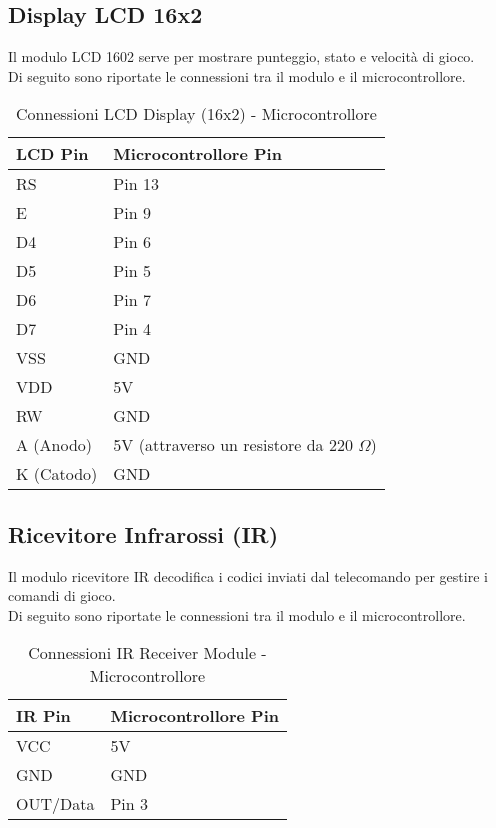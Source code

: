 \documentclass[a4paper, 12pt]{article}
\begin{document}
\subsection{Display LCD 16x2}
Il modulo LCD 1602 serve per mostrare punteggio, stato e velocità di gioco.\\
Di seguito sono riportate le connessioni tra il modulo e il microcontrollore.
\begin{table}[H]
  \centering
  \caption{Connessioni LCD Display (16x2) - Microcontrollore}
  \label{tab:lcd-16x2-connections}
  \begin{tabular}{ll}
    \toprule
    \textbf{LCD Pin} & \textbf{Microcontrollore Pin} \\
    \midrule
    RS           & Pin 13                     \\
    E            & Pin 9                      \\
    D4           & Pin 6                      \\
    D5           & Pin 5                      \\
    D6           & Pin 7                      \\
    D7           & Pin 4                      \\
    VSS          & GND                        \\
    VDD          & 5V                         \\
    RW           & GND                        \\
    A (Anodo)    & 5V (attraverso un resistore da 220 \(\Omega\)) \\
    K (Catodo)  & GND                        \\
    \bottomrule
  \end{tabular}
\end{table}

\subsection{Ricevitore Infrarossi (IR)}
Il modulo ricevitore IR decodifica i codici inviati dal telecomando per gestire i comandi di gioco.\\
Di seguito sono riportate le connessioni tra il modulo e il microcontrollore.
\begin{table}[H]
  \centering
  \caption{Connessioni IR Receiver Module - Microcontrollore}
  \label{tab:ir-receiver-connections}
  \begin{tabular}{ll}
    \toprule
    \textbf{IR Pin} & \textbf{Microcontrollore Pin} \\
    \midrule
    VCC    & 5V    \\
    GND    & GND   \\
    OUT/Data & Pin 3 \\
    \bottomrule
  \end{tabular}
\end{table}
\end{document}
